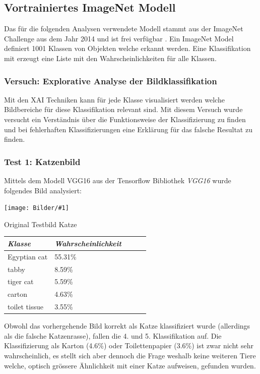 \documentclass[
  12pt, %
  a4paper, %
  oneside, %
  openany, 
  numbers=noenddot, %
  BCOR=5mm, %
  parskip=half*, %
  thesis, %
]{bfhbook}
\newcommand{\imgText}[3]{
\begin{center}
    \begin{minipage}[t]{0.6\textwidth}
    		\vspace{0pt}
		\texttt{[image: Bilder/\#1]}
		\caption{#2}
	\end{minipage}\hfill
    \begin{minipage}[t]{0.4\textwidth}
    		\vspace{20pt}
  		#3
    \end{minipage}
\end{center}
}
\begin{document}
\subsection{Vortrainiertes ImageNet Modell}
Das für die folgenden Analysen verwendete Modell stammt aus der ImageNet Challenge \parencite{imageNet} aus dem Jahr 2014 und ist frei verfügbar \parencite{Simonyan2014}. Ein ImageNet Model definiert 1001 Klassen von Objekten welche erkannt werden. Eine Klassifikation mit \parencite{TensorFlow} erzeugt eine Liste mit den Wahrscheinlichkeiten für alle Klassen. 

\subsubsection*{Versuch: Explorative Analyse der Bildklassifikation}
Mit den \gls{XAI} Techniken kann für jede Klasse visualisiert werden welche Bildbereiche für diese Klassifikation relevant sind. Mit diesem Versuch wurde versucht ein Verständnis über die Funktionsweise der Klassifizierung zu finden und bei fehlerhaften Klassifizierungen eine Erklärung für das falsche Resultat zu finden.

\subsubsection*{Test 1: Katzenbild}
Mittels dem Modell VGG16 aus der Tensorflow Bibliothek \textit{VGG16} \cite{vgg16} wurde folgendes Bild analysiert:
\imgText{Mira.jpg}{Original Testbild Katze}{
		
		\begin{tabular}{@{} *5l @{}}    \toprule
		\emph{Klasse} & \emph{Wahrscheinlichkeit} &&&  \\\midrule
		Egyptian cat & 55.31\% \\ 
		 tabby & 8.59\% \\ 
		 tiger cat & 5.59\% \\ 
		 carton & 4.63\% \\
		 toilet tissue & 3.55\% \\ \bottomrule
		 \hline
		\end{tabular}
}

Obwohl das vorhergehende Bild korrekt als Katze klassifiziert wurde (allerdings als die falsche Katzenrasse), fallen die 4. und 5. Klassifikation auf. Die Klassifizierung als Karton (4.6\%) oder Toilettenpapier (3.6\%) ist zwar nicht sehr wahrscheinlich, es stellt sich aber dennoch die Frage weshalb keine weiteren Tiere welche, optisch grössere Ähnlichkeit mit einer Katze aufweisen, gefunden wurden.
\end{document}
